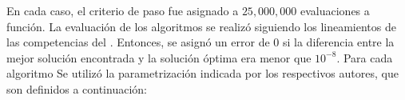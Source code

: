 En cada caso, el criterio de paso fue asignado a $25,000,000$ evaluaciones a función.
%
La evaluación de los algoritmos se realizó siguiendo los lineamientos de las competencias del \CEC{}.
%
Entonces, se asignó un error de $0$ si la diferencia entre la mejor solución encontrada y la solución óptima era menor que $10^{-8}$.
%
%
Para cada algoritmo Se utilizó la parametrización indicada por los respectivos autores, que son definidos a continuación:
